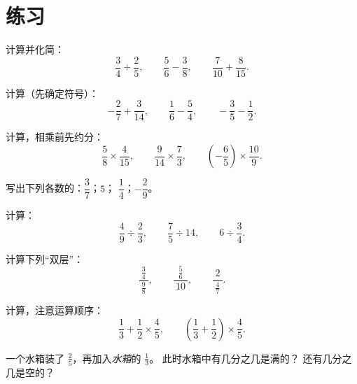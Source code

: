 \section{练习}

\begin{exercise}[$\star$]\label{exo:g8:fractions:1}
计算并化简：
\[
\frac{3}{4} + \frac{2}{5}, \qquad
\frac{5}{6} - \frac{3}{8}, \qquad
\frac{7}{10} + \frac{8}{15} .
\]
\end{exercise}

\begin{exercise}[$\star$]\label{exo:g8:fractions:2}
计算（先确定符号）：
\[
-\frac{2}{7} + \frac{3}{14}, \qquad
\frac{1}{6} - \frac{5}{4}, \qquad
-\frac{3}{5} - \frac{1}{2} .
\]
\end{exercise}

\begin{exercise}[$\star$]\label{exo:g8:fractions:3}
计算，相乘前先约分：
\[
\frac{5}{8} \times \frac{4}{15}, \qquad
\frac{9}{14} \times \frac{7}{3}, \qquad
\left(-\frac{6}{5}\right) \times \frac{10}{9} .
\]
\end{exercise}

\begin{exercise}[$\star$]\label{exo:g8:fractions:4}
写出下列各数的：$\dfrac{3}{7}$；\quad $5$；\quad
$\dfrac{1}{4}$；\quad $-\dfrac{2}{9}$。
\end{exercise}

\begin{exercise}[$\star$]\label{exo:g8:fractions:5}
计算：
\[
\frac{4}{9} \div \frac{2}{3}, \qquad
\frac{7}{5} \div 14, \qquad
6 \div \frac{3}{4} .
\]
\end{exercise}

\begin{exercise}[$\star$]\label{exo:g8:fractions:6}
计算下列“双层”：
\[
\frac{\ \frac{3}{4}\ }{\ \frac{9}{8}\ },
\qquad
\frac{\ \frac{5}{6}\ }{\ 10\ },
\qquad
\frac{\ 2\ }{\ \frac{4}{7}\ } .
\]
\end{exercise}

\begin{exercise}[$\star$]\label{exo:g8:fractions:7}
计算，注意运算顺序：
\[
\frac{1}{3} + \frac{1}{2} \times \frac{4}{5},
\qquad
\left(\frac{1}{3} + \frac{1}{2}\right) \times \frac{4}{5} .
\]
\end{exercise}

\begin{exercise}[$\star\star$]\label{exo:g8:fractions:8}
一个水箱装了 $\frac{2}{5}$，再加入\emph{水箱}的 $\frac{1}{3}$。
此时水箱中有几分之几是满的？
还有几分之几是空的？
\end{exercise}

